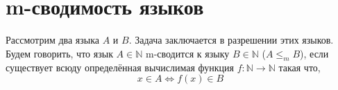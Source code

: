 \documentclass[11pt]{article}
\begin{document}
\section{m-сводимость языков}
Рассмотрим два языка $A$ и $B$. Задача заключается в разрешении этих языков. 
Будем говорить, что язык $A\in \mathbb{N}$ m-сводится к языку $B\in \mathbb{N}$  ($A\le_m B$), если существует всюду определённая вычислимая функция $f: \mathbb{N}\to \mathbb{N}$ такая что, 
\[ x\in A \Leftrightarrow f(x)\in B \]
\end{document}
